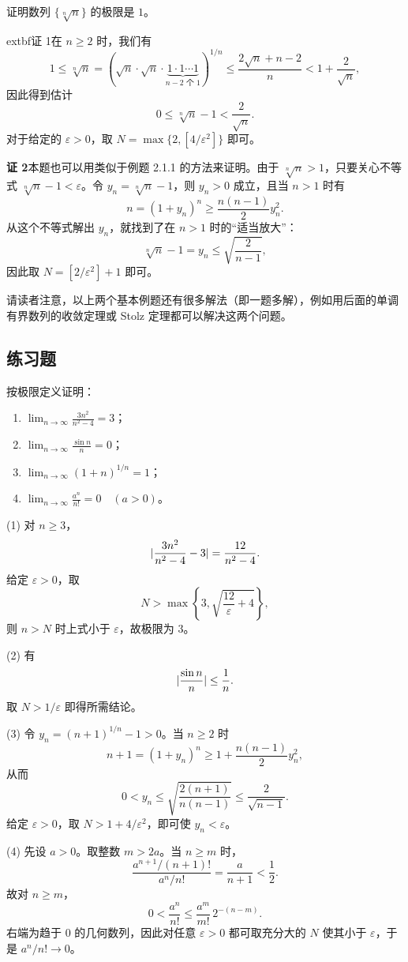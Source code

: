 \begin{xexample}[2.1.2]
证明数列 $\{\sqrt[n]{n}\}$ 的极限是 $1$。
\end{xexample}
\begin{xproof}
	extbf{证 1}\quad 在 $n\ge2$ 时，我们有
\[
  1\le\sqrt[n]{n}
  =\left(\sqrt n\cdot\sqrt n\cdot\underbrace{1\cdot1\cdots1}_{n-2\text{ 个 }1}\right)^{1/n}
  \le\frac{2\sqrt n+n-2}{n}
  <1+\frac2{\sqrt n},
\]
因此得到估计
\[
  0\le\sqrt[n]{n}-1<\frac2{\sqrt n}.
\]
对于给定的 $\varepsilon>0$，取 $N=\max\{2,[4/\varepsilon^2]\}$ 即可。

\textbf{证 2}\quad 本题也可以用类似于例题 2.1.1 的方法来证明。由于 $\sqrt[n]{n}>1$，只要关心不等式 $\sqrt[n]{n}-1<\varepsilon$。令 $y_n=\sqrt[n]{n}-1$，则 $y_n>0$ 成立，且当 $n>1$ 时有
\[
  n=(1+y_n)^n\ge\frac{n(n-1)}2y_n^2.
\]
从这个不等式解出 $y_n$，就找到了在 $n>1$ 时的“适当放大”：
\[
  \sqrt[n]{n}-1=y_n\le\sqrt{\frac2{n-1}},
\]
因此取 $N=[2/\varepsilon^2]+1$ 即可。
\end{xproof}

\begin{xremark}
请读者注意，以上两个基本例题还有很多解法（即一题多解），例如用后面的单调有界数列的收敛定理或 Stolz 定理都可以解决这两个问题。
\end{xremark}

\subsection{练习题}

\begin{xexercise}[1]
按极限定义证明：
  \begin{enumerate}[label=(\arabic*)]
    \item $\displaystyle\lim_{n\to\infty}\frac{3n^2}{n^2-4}=3$；
    \item $\displaystyle\lim_{n\to\infty}\frac{\sin n}{n}=0$；
    \item $\displaystyle\lim_{n\to\infty}(1+n)^{1/n}=1$；
    \item $\displaystyle\lim_{n\to\infty}\frac{a^n}{n!}=0\quad(a>0)$。
  \end{enumerate}
\end{xexercise}
\begin{xsolution}
(1) 对 $n\ge3$，
\[
  \lvert\frac{3n^2}{n^2-4}-3\rvert
  =\frac{12}{n^2-4}.
\]
给定 $\varepsilon>0$，取
\[
  N>\max\left\{3,\sqrt{\frac{12}{\varepsilon}+4}\right\},
\]
则 $n>N$ 时上式小于 $\varepsilon$，故极限为 $3$。

(2) 有
\[
  \lvert\frac{\sin n}{n}\rvert\le\frac1n.
\]
取 $N>1/\varepsilon$ 即得所需结论。

(3) 令 $y_n=(n+1)^{1/n}-1>0$。当 $n\ge2$ 时
\[
  n+1=(1+y_n)^n\ge1+\frac{n(n-1)}2y_n^2,
\]
从而
\[
  0<y_n\le\sqrt{\frac{2(n+1)}{n(n-1)}}
  \le\frac2{\sqrt{n-1}}.
\]
给定 $\varepsilon>0$，取 $N>1+4/\varepsilon^2$，即可使 $y_n<\varepsilon$。

(4) 先设 $a>0$。取整数 $m>2a$。当 $n\ge m$ 时，
\[
  \frac{a^{n+1}/(n+1)!}{a^n/n!}=\frac a{n+1}<\frac12.
\]
故对 $n\ge m$，
\[
  0<\frac{a^n}{n!}
  \le \frac{a^m}{m!}\,2^{-(n-m)}.
\]
右端为趋于 $0$ 的几何数列，因此对任意 $\varepsilon>0$ 都可取充分大的 $N$ 使其小于 $\varepsilon$，于是 $a^n/n!\to0$。
\end{xsolution}


